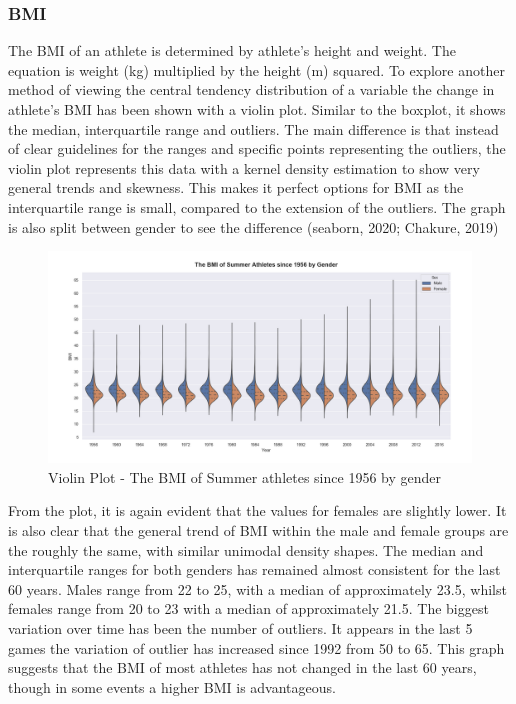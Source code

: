 \documentclass[a4 paper, 12pt]{article}
\begin{document}
        \subsubsection{BMI}
        The BMI of an athlete is determined by athlete's height and weight. The equation is weight (kg) multiplied by the height (m) squared. To explore another method of viewing the central tendency distribution of a variable the change in athlete's BMI has been shown with a violin plot. Similar to the boxplot, it shows the median, interquartile range and outliers. The main difference is that instead of clear guidelines for the ranges and specific points representing the outliers, the violin plot represents this data with a kernel density estimation to show very general trends and skewness. This makes it perfect options for BMI as the interquartile range is small, compared to the extension of the outliers. The graph is also split between gender to see the difference (seaborn, 2020; Chakure, 2019)
        \begin{figure} [H]
            \centering
            \includegraphics[width=\textwidth, frame]
                {./images/graph/athlete_BMI_violinplot.png}      
                \caption{Violin Plot - The BMI of Summer athletes since 1956 by gender} 
        \end{figure}
        From the plot, it is again evident that the values for females are slightly lower. It is also clear that the general trend of BMI within the male and female groups are the roughly the same, with similar unimodal density shapes. The median and interquartile ranges for both genders has remained almost consistent for the last 60 years. Males range from 22 to 25, with a median of approximately 23.5, whilst females range from 20 to 23 with a median of approximately 21.5. The biggest variation over time has been the number of outliers. It appears in the last 5 games the variation of outlier has increased since 1992 from 50 to 65. This graph suggests that the BMI of most athletes has not changed in the last 60 years, though in some events a higher BMI is advantageous.
\end{document}
